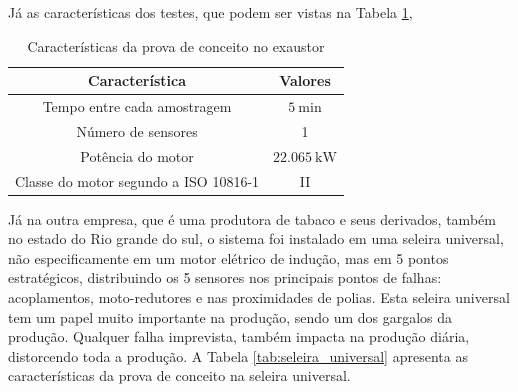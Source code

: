 Já as características dos testes, que podem ser vistas na Tabela \ref{tab:exautor}, 

\begin{table}[H]
    \caption{Características da prova de conceito no exaustor}
    \label{tab:exautor}
    \centering%
    \begin{minipage}{.55\textwidth}
      \begin{tabular*}{\textwidth}{c|c}
        \hline
        Característica                          & Valores                                    \\ \hline
        \hline
        Tempo entre cada amostragem             &  $\SI{5}{\minute}$                         \\
        Número de sensores                      &  1                                         \\ 
        Potência do motor                       &  $\SI{22.065}{\kilo\watt}$                      \\
        Classe do motor segundo a  ISO 10816-1  &  II                                         \\
      \end{tabular*}
    \end{minipage}
  \end{table}


Já na outra empresa, que é uma produtora de tabaco e seus derivados, também no estado do Rio grande do sul, o sistema foi instalado em uma 
seleira universal, não especificamente em um motor elétrico de indução, mas em 5 pontos estratégicos, distribuindo os 5 sensores nos principais pontos 
de falhas: acoplamentos, moto-redutores e nas proximidades de polias. Esta seleira universal tem um papel muito importante na produção, sendo um dos gargalos
da produção. Qualquer falha imprevista, também impacta na produção diária, distorcendo toda a produção. A Tabela \ref{tab:seleira_universal} apresenta 
as características da prova de conceito na seleira universal.

